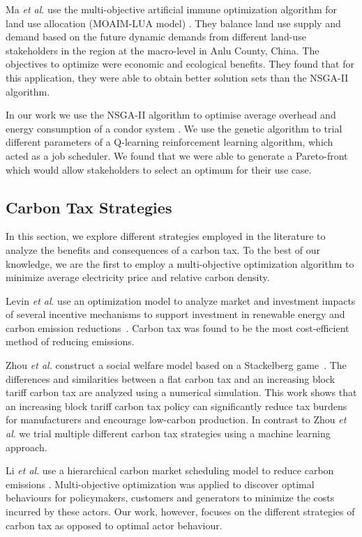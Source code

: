 Ma \textit{et al}. use the multi-objective artificial immune optimization algorithm for land use allocation (MOAIM-LUA model) \cite{Ma2015}. They balance land use supply and demand based on the future dynamic demands from different land-use stakeholders in the region at the macro-level in Anlu County, China. The objectives to optimize were economic and ecological benefits. They found that for this application, they were able to obtain better solution sets than the NSGA-II algorithm.

In our work we use the NSGA-II algorithm to optimise average overhead and energy consumption of a condor system \cite{Kell2019}. We use the genetic algorithm to trial different parameters of a Q-learning reinforcement learning algorithm, which acted as a job scheduler. We found that we were able to generate a Pareto-front  which would allow stakeholders to select an optimum for their use case. 


\subsection{Carbon Tax Strategies}

In this section, we explore different strategies employed in the literature to analyze the benefits and consequences of a carbon tax. To the best of our knowledge, we are the first to employ a multi-objective optimization algorithm to minimize average electricity price and relative carbon density.

Levin \textit{et al}. use an optimization model to analyze market and investment impacts of several incentive mechanisms to support investment in renewable energy and carbon emission reductions~\cite{Levin2019}. Carbon tax was found to be the most cost-efficient method of reducing emissions.

Zhou \textit{et al.} construct a social welfare model based on a Stackelberg game~\cite{Zhou2019}. The differences and similarities between a flat carbon tax and an increasing block tariff carbon tax are analyzed using a numerical simulation. This work shows that an increasing block tariff carbon tax policy can significantly reduce tax burdens for manufacturers and encourage low-carbon production. In contrast to Zhou \textit{et al}. we trial multiple different carbon tax strategies using a machine learning approach. 

Li \textit{et al}. use a hierarchical carbon market scheduling model to reduce carbon emissions \cite{Li2017}. Multi-objective optimization was applied to discover optimal behaviours for policymakers, customers and generators to minimize the costs incurred by these actors. Our work, however, focuses on the different strategies of carbon tax as opposed to optimal actor behaviour.


